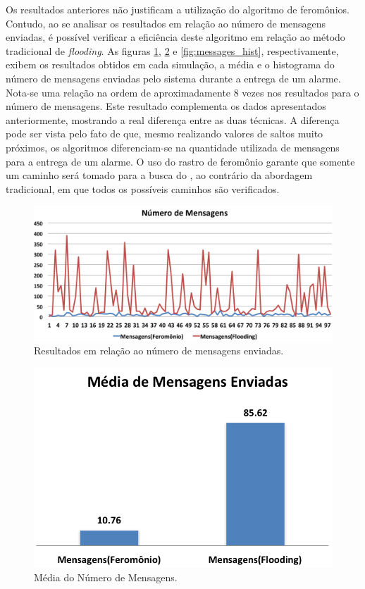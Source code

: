 Os resultados anteriores não justificam a utilização do algoritmo de feromônios. Contudo, ao se analisar os resultados em relação ao número de mensagens enviadas, é possível verificar a eficiência deste algoritmo em relação ao método tradicional de \emph{flooding}. As figuras \ref{fig:messages}, \ref{fig:messages_mean} e \ref{fig:messages_hist}, respectivamente, exibem os resultados obtidos em cada simulação, a média e o histograma do número de mensagens enviadas pelo sistema durante a entrega de um alarme. Nota-se uma relação na ordem de aproximadamente 8 vezes nos resultados para o número de mensagens. Este resultado complementa os dados apresentados anteriormente, mostrando a real diferença entre as duas técnicas. A diferença pode ser vista pelo fato de que, mesmo realizando valores de saltos muito próximos, os algoritmos diferenciam-se na quantidade utilizada de mensagens para a entrega de um alarme. O uso do rastro de feromônio garante que somente um caminho será tomado para a busca do \vant, ao contrário da abordagem tradicional, em que todos os possíveis caminhos são verificados.

 \begin{figure}[h!]
 \centering
 \includegraphics[width=13cm]{results/messages.png}
 \caption{Resultados em relação ao número de mensagens enviadas.}
  \label{fig:messages}
 \end{figure}

 \begin{figure}[h!]
 \centering
 \includegraphics{results/messages_mean.png}
 \caption{Média do Número de Mensagens.}
  \label{fig:messages_mean}
 \end{figure}

